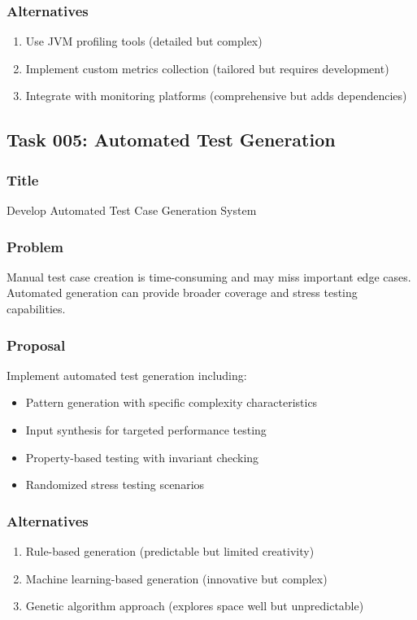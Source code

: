 \documentclass[11pt,a4paper]{article}
\begin{document}
\subsubsection{Alternatives}
\begin{enumerate}
    \item Use JVM profiling tools (detailed but complex)
    \item Implement custom metrics collection (tailored but requires development)
    \item Integrate with monitoring platforms (comprehensive but adds dependencies)
\end{enumerate}

\subsection{Task 005: Automated Test Generation}

\subsubsection{Title}
Develop Automated Test Case Generation System

\subsubsection{Problem}
Manual test case creation is time-consuming and may miss important edge cases. Automated generation can provide broader coverage and stress testing capabilities.

\subsubsection{Proposal}
Implement automated test generation including:
\begin{itemize}
    \item Pattern generation with specific complexity characteristics
    \item Input synthesis for targeted performance testing
    \item Property-based testing with invariant checking
    \item Randomized stress testing scenarios
\end{itemize}

\subsubsection{Alternatives}
\begin{enumerate}
    \item Rule-based generation (predictable but limited creativity)
    \item Machine learning-based generation (innovative but complex)
    \item Genetic algorithm approach (explores space well but unpredictable)
\end{enumerate}
\end{document}
